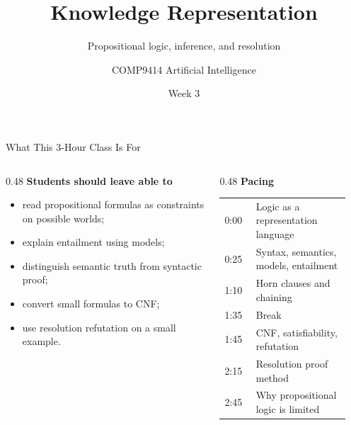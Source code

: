 \documentclass[aspectratio=169,11pt]{beamer}
\title{Knowledge Representation}
\subtitle{Propositional logic, inference, and resolution}
\author{COMP9414 Artificial Intelligence}
\date{Week 3}
\newcommand{\minihead}[1]{\textbf{\color{unswblue}#1}}
\begin{document}
\begin{frame}
  \titlepage
\end{frame}

\begin{frame}{What This 3-Hour Class Is For}
  \begin{columns}[T,onlytextwidth]
    \begin{column}{0.48\textwidth}
      \minihead{Students should leave able to}
      \begin{itemize}
        \item read propositional formulas as constraints on possible worlds;
        \item explain entailment using models;
        \item distinguish semantic truth from syntactic proof;
        \item convert small formulas to CNF;
        \item use resolution refutation on a small example.
      \end{itemize}
    \end{column}
    \begin{column}{0.48\textwidth}
      \minihead{Pacing}
      \begin{tabular}{p{0.22\linewidth}p{0.66\linewidth}}
        0:00 & Logic as a representation language \\
        0:25 & Syntax, semantics, models, entailment \\
        1:10 & Horn clauses and chaining \\
        1:35 & Break \\
        1:45 & CNF, satisfiability, refutation \\
        2:15 & Resolution proof method \\
        2:45 & Why propositional logic is limited \\
      \end{tabular}
    \end{column}
  \end{columns}
\end{frame}
\end{document}
